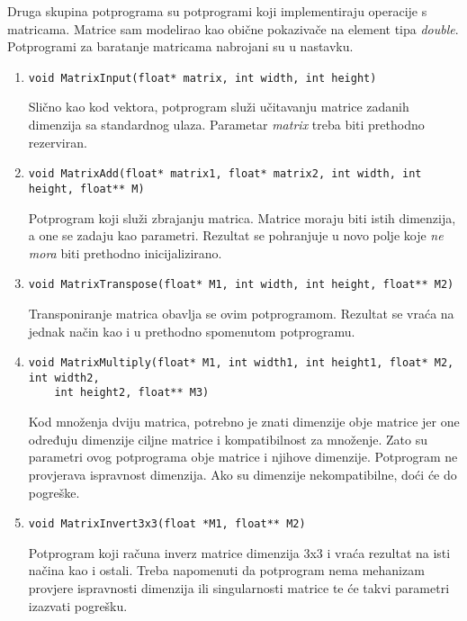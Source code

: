 \documentclass[utf8]{fer}
\begin{document}
Druga skupina potprograma su potprogrami koji implementiraju operacije s matricama. Matrice sam modelirao kao obične pokazivače na element tipa \textit{double}. Potprogrami za baratanje matricama nabrojani su u nastavku.

\begin{enumerate}
\item \begin{lstlisting}
void MatrixInput(float* matrix, int width, int height)
\end{lstlisting}
Slično kao kod vektora, potprogram služi učitavanju matrice zadanih dimenzija sa standardnog ulaza. Parametar \textit{matrix} treba biti prethodno rezerviran. 

\item \begin{lstlisting}
void MatrixAdd(float* matrix1, float* matrix2, int width, int height, float** M)
\end{lstlisting}
Potprogram koji služi zbrajanju matrica. Matrice moraju biti istih dimenzija, a one se zadaju kao parametri. Rezultat se pohranjuje u novo polje koje \textit{ne mora} biti prethodno inicijalizirano.

\item \begin{lstlisting}
void MatrixTranspose(float* M1, int width, int height, float** M2)
\end{lstlisting}
Transponiranje matrica obavlja se ovim potprogramom. Rezultat se vraća na jednak način kao i u prethodno spomenutom potprogramu.

\item \begin{lstlisting}
void MatrixMultiply(float* M1, int width1, int height1, float* M2, int width2, 
	int height2, float** M3)
\end{lstlisting}

Kod množenja dviju matrica, potrebno je znati dimenzije obje matrice jer one određuju dimenzije ciljne matrice i kompatibilnost za množenje. Zato su parametri ovog potprograma obje matrice i njihove dimenzije. Potprogram ne provjerava ispravnost dimenzija. Ako su dimenzije nekompatibilne, doći će do pogreške.

\item \begin{lstlisting}
void MatrixInvert3x3(float *M1, float** M2)
\end{lstlisting}
Potprogram koji računa inverz matrice dimenzija 3x3 i vraća rezultat na isti načina kao i ostali. Treba napomenuti da potprogram nema mehanizam provjere ispravnosti dimenzija ili singularnosti matrice te će takvi parametri izazvati pogrešku.


\end{enumerate}
\end{document}
